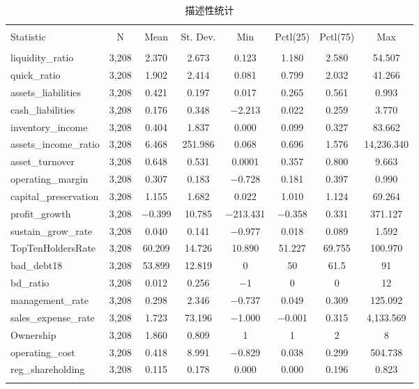 \begin{table}[!htbp] \centering 
    \caption{描述性统计} 
    \label{descriptive_statistics}
  \begin{tabular}{@{\extracolsep{5pt}}lccccccc} 
  \\[-1.8ex]\hline 
  \hline \\[-1.8ex] 
  Statistic & \multicolumn{1}{c}{N} & \multicolumn{1}{c}{Mean} & \multicolumn{1}{c}{St. Dev.} & \multicolumn{1}{c}{Min} & \multicolumn{1}{c}{Pctl(25)} & \multicolumn{1}{c}{Pctl(75)} & \multicolumn{1}{c}{Max} \\ 
  \hline \\[-1.8ex] 
  liquidity\_ratio & 3,208 & 2.370 & 2.673 & 0.123 & 1.180 & 2.580 & 54.507 \\ 
  quick\_ratio & 3,208 & 1.902 & 2.414 & 0.081 & 0.799 & 2.032 & 41.266 \\ 
  assets\_liabilities & 3,208 & 0.421 & 0.197 & 0.017 & 0.265 & 0.561 & 0.993 \\ 
  cash\_liabilities & 3,208 & 0.176 & 0.348 & $-$2.213 & 0.022 & 0.259 & 3.770 \\ 
  inventory\_income & 3,208 & 0.404 & 1.837 & 0.000 & 0.099 & 0.327 & 83.662 \\ 
  assets\_income\_ratio & 3,208 & 6.468 & 251.986 & 0.068 & 0.696 & 1.576 & 14,236.340 \\ 
  asset\_turnover & 3,208 & 0.648 & 0.531 & 0.0001 & 0.357 & 0.800 & 9.663 \\ 
  operating\_margin & 3,208 & 0.307 & 0.183 & $-$0.728 & 0.181 & 0.397 & 0.990 \\ 
  capital\_preservation & 3,208 & 1.155 & 1.682 & 0.022 & 1.010 & 1.124 & 69.264 \\ 
  profit\_growth & 3,208 & $-$0.399 & 10.785 & $-$213.431 & $-$0.358 & 0.331 & 371.127 \\ 
  sustain\_grow\_rate & 3,208 & 0.040 & 0.141 & $-$0.977 & 0.018 & 0.089 & 1.592 \\ 
  TopTenHoldersRate & 3,208 & 60.209 & 14.726 & 10.890 & 51.227 & 69.755 & 100.970 \\ 
  bad\_debt18 & 3,208 & 53.899 & 12.819 & 0 & 50 & 61.5 & 91 \\ 
  bd\_ratio & 3,208 & 0.012 & 0.256 & $-$1 & 0 & 0 & 12 \\ 
  management\_rate & 3,208 & 0.298 & 2.346 & $-$0.737 & 0.049 & 0.309 & 125.092 \\ 
  sales\_expense\_rate & 3,208 & 1.723 & 73.196 & $-$1.000 & $-$0.001 & 0.315 & 4,133.569 \\ 
  Ownership & 3,208 & 1.860 & 0.809 & 1 & 1 & 2 & 8 \\ 
  operating\_cost & 3,208 & 0.418 & 8.991 & $-$0.829 & 0.038 & 0.299 & 504.738 \\ 
  reg\_shareholding & 3,208 & 0.115 & 0.178 & 0.000 & 0.000 & 0.196 & 0.823 \\ 
  \hline \\[-1.8ex] 
  \end{tabular} 
  \end{table} 


